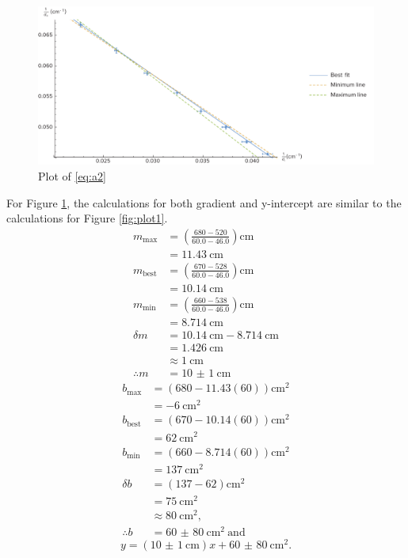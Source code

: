 \documentclass[letter,12pt]{article}
\numberwithin{equation}{section}
\numberwithin{figure}{section}
\numberwithin{table}{section}
\begin{document}
\begin{figure}[!ht]
  \centering
  \includegraphics[width=\textwidth]{plot2.pdf}
  \caption{Plot of \eqref{eq:a2}}
  \label{fig:plot2}
\end{figure}
\pagebreak

For Figure \ref{fig:plot2}, the calculations for both gradient and y-intercept are similar to the calculations for Figure \ref{fig:plot1}.
\begin{align*}
m_{\textrm{max}} &= \left(\frac{680-520}{60.0-46.0} \right)\si{\cm} \\ 
&= \SI{11.43}{\cm} \\
m_{\textrm{best}} &= \left(\frac{670-528}{60.0-46.0} \right)\si{\cm} \\
&= \SI{10.14}{\cm}\\
m_{\textrm{min}} &= \left(\frac{660-538}{60.0-46.0} \right)\si{\cm} \\
&= \SI{8.714}{\cm} \\
\delta m &= \SI{10.14}{\cm} - \SI{8.714}{\cm} \\
&= \SI{1.426}{\cm} \\
&\approx \SI{1}{\cm} \\
\therefore m &= \SI{10(1)}{\cm}
\end{align*}
\begin{align*}
b_{\textrm{max}} &= (680 -11.43(60)) \si{\cm^2} \\
&= \SI{-6}{\cm^2} \\
b_{\textrm{best}} &= (670 - 10.14(60)) \si{\cm^2} \\
&= \SI{62}{\cm^2} \\
b_{\textrm{min}} &= (660 - 8.714(60)) \si{\cm^2} \\
&= \SI{137}{\cm^2} \\
\delta b &= (137 - 62) \si{\cm^2} \\
&= \SI{75}{\cm^2} \\
&\approx \SI{80}{\cm^2}, \\
\therefore b &= \SI{60(80)}{\cm^{2}} \ \text{and}
\end{align*}
\[y = (\SI{10(1)}{\cm})x + \SI{60(80)}{\cm^{2}}.\]
\end{document}
